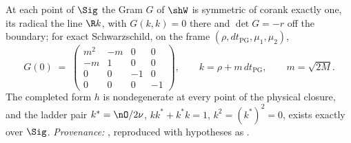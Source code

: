 At each point of $\Sig$ the Gram $G$ of $\shW$ is symmetric of corank exactly one, its radical the line $\R k$, with $G(k,k) = 0$ there and $\det G = -r$ off the boundary; for exact Schwarzschild, on the frame $(\rho, dt_{\mathrm{PG}}, \mu_1, \mu_2)$,
\[
G(0) \;=\; \begin{pmatrix} m^2 & -m & 0 & 0\\ -m & 1 & 0 & 0\\ 0 & 0 & -1 & 0\\ 0 & 0 & 0 & -1 \end{pmatrix}, \qquad k = \rho + m\,dt_{\mathrm{PG}}, \qquad m = \sqrt{2M}.
\]
The completed form $h$ is nondegenerate at every point of the physical closure, and the ladder pair $k^{*} = \nO/2\nu$, $kk^{*} + k^{*}k = 1$, $k^{2} = (k^{*})^{2} = 0$, exists exactly over $\Sig$. \emph{Provenance:} \cite[Thms 8.7, 8.12]{ButlerT4}, reproduced with hypotheses as \cite[Facts B.1, B.2]{ButlerT5}.
